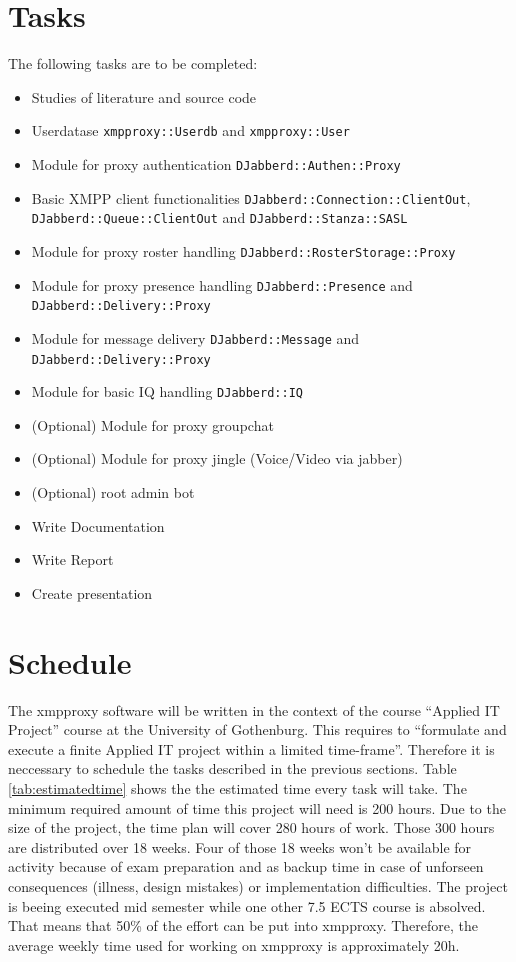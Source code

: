 \documentclass[a4paper,10pt,numbers=noendperiod]{scrartcl}
\begin{document}
\section{Tasks}
The following tasks are to be completed:
\begin{itemize}
	\item Studies of literature and source code
	\item Userdatase \texttt{xmpproxy::Userdb} and \texttt{xmpproxy::User}
	\item Module for proxy authentication \texttt{DJabberd::Authen::Proxy}
	\item Basic XMPP client functionalities \texttt{DJabberd::Connection::ClientOut}, \texttt{DJabberd::Queue::ClientOut} and \texttt{DJabberd::Stanza::SASL}
	\item Module for proxy roster handling \texttt{DJabberd::RosterStorage::Proxy}
	\item Module for proxy presence handling \texttt{DJabberd::Presence} and \texttt{DJabberd::Delivery::Proxy}
	\item Module for message delivery \texttt{DJabberd::Message} and \texttt{DJabberd::Delivery::Proxy}
	\item Module for basic IQ handling \texttt{DJabberd::IQ}
	\item (Optional) Module for proxy groupchat 
	\item (Optional) Module for proxy jingle (Voice/Video via jabber)	
	\item (Optional) root admin bot                                  
	\item Write Documentation	
	\item Write Report
	\item Create presentation
\end{itemize}


\section{Schedule}
The xmpproxy software will be written in the context of the course ``Applied IT Project'' course at the University of Gothenburg. This requires to ``formulate and execute a finite Applied IT project within a limited time-frame''. 
Therefore it is neccessary to schedule the tasks described in the previous sections. 
Table \ref{tab:estimatedtime} shows the the estimated time every task will take. The minimum required amount of time this project will need is 200 hours. Due to the size of the project, the time plan will cover 280 hours of work. Those 300 hours are distributed over 18 weeks. Four of those 18 weeks won't be available for activity because of exam preparation and as backup time in case of unforseen consequences (illness, design mistakes) or implementation difficulties. The project is beeing executed mid semester while one other 7.5 ECTS course is absolved. That means that 50\% of the effort can be put into xmpproxy. Therefore, the average weekly time used for working on xmpproxy is approximately 20h.
\end{document}

